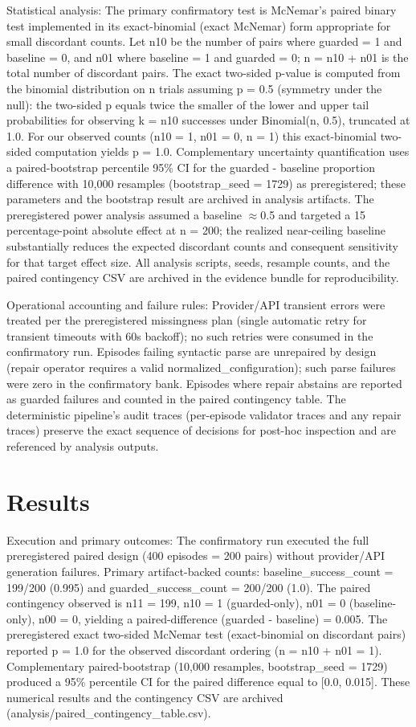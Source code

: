 \documentclass[conference]{IEEEtran}
\begin{document}
Statistical analysis: The primary confirmatory test is McNemar's paired binary test implemented in its exact-binomial (exact McNemar) form appropriate for small discordant counts. Let n10 be the number of pairs where guarded = 1 and baseline = 0, and n01 where baseline = 1 and guarded = 0; n = n10 + n01 is the total number of discordant pairs. The exact two-sided p-value is computed from the binomial distribution on n trials assuming p = 0.5 (symmetry under the null): the two-sided p equals twice the smaller of the lower and upper tail probabilities for observing k = n10 successes under Binomial(n, 0.5), truncated at 1.0. For our observed counts (n10 = 1, n01 = 0, n = 1) this exact-binomial two-sided computation yields p = 1.0. Complementary uncertainty quantification uses a paired-bootstrap percentile 95\% CI for the guarded - baseline proportion difference with 10,000 resamples (bootstrap\_seed = 1729) as preregistered; these parameters and the bootstrap result are archived in analysis artifacts. The preregistered power analysis assumed a baseline \ensuremath{\approx}0.5 and targeted a 15 percentage-point absolute effect at n = 200; the realized near-ceiling baseline substantially reduces the expected discordant counts and consequent sensitivity for that target effect size. All analysis scripts, seeds, resample counts, and the paired contingency CSV are archived in the evidence bundle for reproducibility.

Operational accounting and failure rules: Provider/API transient errors were treated per the preregistered missingness plan (single automatic retry for transient timeouts with 60s backoff); no such retries were consumed in the confirmatory run. Episodes failing syntactic parse are unrepaired by design (repair operator requires a valid normalized\_configuration); such parse failures were zero in the confirmatory bank. Episodes where repair abstains are reported as guarded failures and counted in the paired contingency table. The deterministic pipeline's audit traces (per-episode validator traces and any repair traces) preserve the exact sequence of decisions for post-hoc inspection and are referenced by analysis outputs.

\section{Results}
Execution and primary outcomes: The confirmatory run executed the full preregistered paired design (400 episodes = 200 pairs) without provider/API generation failures. Primary artifact-backed counts: baseline\_success\_count = 199/200 (0.995) and guarded\_success\_count = 200/200 (1.0). The paired contingency observed is n11 = 199, n10 = 1 (guarded-only), n01 = 0 (baseline-only), n00 = 0, yielding a paired-difference (guarded - baseline) = 0.005. The preregistered exact two-sided McNemar test (exact-binomial on discordant pairs) reported p = 1.0 for the observed discordant ordering (n = n10 + n01 = 1). Complementary paired-bootstrap (10,000 resamples, bootstrap\_seed = 1729) produced a 95\% percentile CI for the paired difference equal to [0.0, 0.015]. These numerical results and the contingency CSV are archived (analysis/paired\_contingency\_table.csv).
\end{document}
